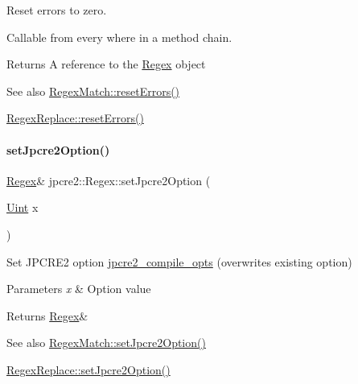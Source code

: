 Reset errors to zero. 

Callable from every where in a method chain. \begin{DoxyReturn}{Returns}
A reference to the \hyperlink{classjpcre2_1_1Regex}{Regex} object 
\end{DoxyReturn}
\begin{DoxySeeAlso}{See also}
\hyperlink{classjpcre2_1_1RegexMatch_aa19512638f2f5389384d6b9ad01c70c0_aa19512638f2f5389384d6b9ad01c70c0}{Regex\+Match\+::reset\+Errors()} 

\hyperlink{classjpcre2_1_1RegexReplace_a1d708fe8f948d260a8e033cff7898f9c_a1d708fe8f948d260a8e033cff7898f9c}{Regex\+Replace\+::reset\+Errors()} 
\end{DoxySeeAlso}
\hypertarget{classjpcre2_1_1Regex_a031617a19638ef752dcd2b29fa3464d5_a031617a19638ef752dcd2b29fa3464d5}{}\label{classjpcre2_1_1Regex_a031617a19638ef752dcd2b29fa3464d5_a031617a19638ef752dcd2b29fa3464d5} 
\paragraph{\texorpdfstring{set\+Jpcre2\+Option()}{setJpcre2Option()}}
{\footnotesize\ttfamily \hyperlink{classjpcre2_1_1Regex}{Regex}\& jpcre2\+::\+Regex\+::set\+Jpcre2\+Option (\begin{DoxyParamCaption}\item[{\hyperlink{namespacejpcre2_a078242d38221a13fb3543b9edd78c099}{Uint}}]{x }\end{DoxyParamCaption})\hspace{0.3cm}{\ttfamily [inline]}}



Set J\+P\+C\+R\+E2 option \hyperlink{classjpcre2_1_1Regex_abdd26c3bc1c3132f0aa73dde1690a7ef}{jpcre2\+\_\+compile\+\_\+opts} (overwrites existing option) 


\begin{DoxyParams}{Parameters}
{\em x} & Option value \\
\hline
\end{DoxyParams}
\begin{DoxyReturn}{Returns}
\hyperlink{classjpcre2_1_1Regex}{Regex}\& 
\end{DoxyReturn}
\begin{DoxySeeAlso}{See also}
\hyperlink{classjpcre2_1_1RegexMatch_a0d76033d9c134caa9ddfc21849603920_a0d76033d9c134caa9ddfc21849603920}{Regex\+Match\+::set\+Jpcre2\+Option()} 

\hyperlink{classjpcre2_1_1RegexReplace_a745ab0b979035214a83ed0a04686ef6a_a745ab0b979035214a83ed0a04686ef6a}{Regex\+Replace\+::set\+Jpcre2\+Option()} 
\end{DoxySeeAlso}
\hypertarget{classjpcre2_1_1Regex_a56721534519e5cb436337043eee8f42d_a56721534519e5cb436337043eee8f42d}{}\label{classjpcre2_1_1Regex_a56721534519e5cb436337043eee8f42d_a56721534519e5cb436337043eee8f42d} 
